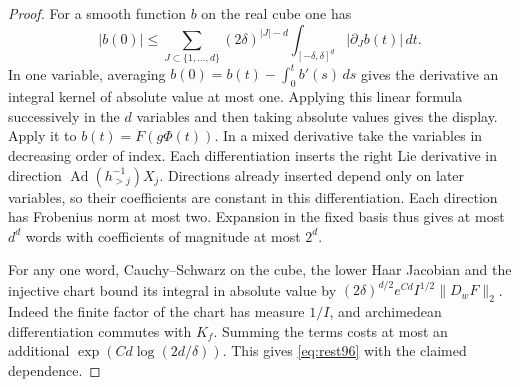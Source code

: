 \documentclass[a4paper,11pt]{article}
\theoremstyle{definition}
\theoremstyle{remark}
\numberwithin{equation}{section}
\begin{document}
\begin{proof}
For a smooth function \(b\) on the real cube one has
\[
 |b(0)|\le
 \sum_{J\subset\{1,\ldots,d\}} (2\delta)^{|J|-d}
      \int_{[-\delta,\delta]^d}|\partial_J b(t)|\,dt .
\]
In one variable, averaging \(b(0)=b(t)-\int_0^t b'(s)\,ds\)
gives the derivative an integral kernel of absolute value at most
one. Applying this linear formula successively in the \(d\)
variables and then taking absolute values gives the display.
Apply it to \(b(t)=F(g\Phi(t))\). In a mixed derivative take
the variables in decreasing order of index. Each differentiation
inserts the right Lie derivative in direction
\(\operatorname{Ad}(h_{>j}^{-1})X_j\). Directions already inserted
depend only on later variables, so their coefficients are constant
in this differentiation. Each direction has Frobenius norm at
most two. Expansion in the fixed basis thus gives at most \(d^d\)
words with coefficients of magnitude at most \(2^d\).

For any one word, Cauchy--Schwarz on the cube, the lower Haar
Jacobian and the injective chart bound its integral in absolute
value by
\((2\delta)^{d/2}e^{Cd} I^{1/2}\|D_wF\|_2\).
Indeed the finite factor of the chart has measure \(1/I\), and
archimedean differentiation commutes with \(K_f\). Summing the
terms costs at most an additional
\(\exp(Cd\log(2d/\delta))\). This gives \eqref{eq:rest96}
with the claimed dependence.
\end{proof}
\end{document}
